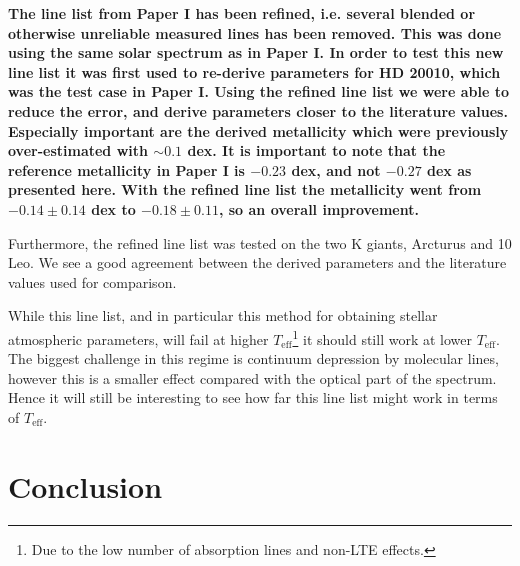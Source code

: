 \documentclass{aa}
\begin{document}
{\bf The line list from Paper I has been refined, i.e. several blended or
otherwise unreliable measured lines has been removed. This was done using the
same solar spectrum as in Paper I. In order to test this new line list it was
first used to re-derive parameters for HD 20010, which was the test case in
Paper I. Using the refined line list we were able to reduce the error, and
derive parameters closer to the literature values. Especially important are the
derived metallicity which were previously over-estimated with $\sim0.1$ dex. It
is important to note that the reference metallicity in Paper I is $-0.23$ dex,
and not $-0.27$ dex as presented here. With the refined line list the
metallicity went from $-0.14\pm0.14$ dex to $-0.18\pm0.11$, so an overall
improvement.

Furthermore, the refined line list was tested on the two K giants, Arcturus and
10 Leo. We see a good agreement between the derived parameters and the
literature values used for comparison.

While this line list, and in particular this method for obtaining stellar
atmospheric parameters, will fail at higher $T_\mathrm{eff}$\footnote{Due to the
low number of absorption lines and non-LTE effects.} it should still work at
lower $T_\mathrm{eff}$. The biggest challenge in this regime is continuum
depression by molecular lines, however this is a smaller effect compared with
the optical part of the spectrum. Hence it will still be interesting to see how
far this line list might work in terms of $T_\mathrm{eff}$.}



\section{Conclusion}
\label{sec:conclusion}
\end{document}
